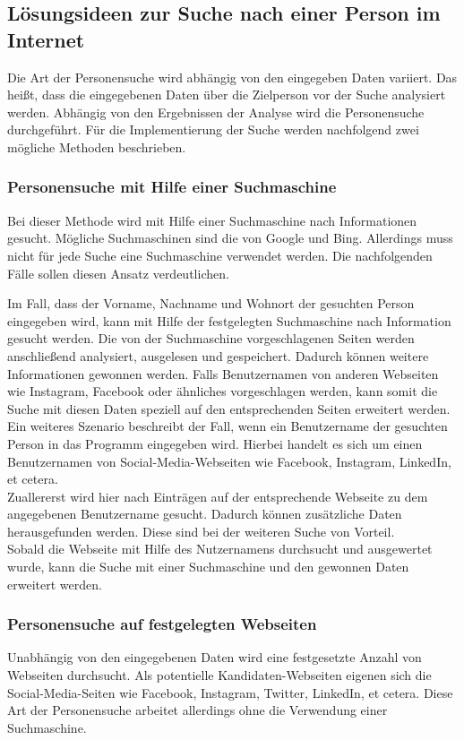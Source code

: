 	\subsection{Lösungsideen zur Suche nach einer Person im Internet}
	\label{sec:Suche nach Information}
	Die Art der Personensuche wird abhängig von den eingegeben Daten variiert. Das heißt, dass die eingegebenen Daten über die Zielperson vor der Suche analysiert werden. Abhängig von den Ergebnissen der Analyse wird die Personensuche durchgeführt. Für die Implementierung der Suche werden nachfolgend zwei mögliche Methoden beschrieben.
	
		\subsubsection{Personensuche mit Hilfe einer Suchmaschine}
		\label{subsubsec:PersonensucheMitHilfevonSuchmaschine}
		Bei dieser Methode wird mit Hilfe einer Suchmaschine nach Informationen gesucht. Mögliche Suchmaschinen sind die von Google und Bing. Allerdings muss nicht für jede Suche eine Suchmaschine verwendet werden. Die nachfolgenden Fälle sollen diesen Ansatz verdeutlichen.
		
		Im Fall, dass der Vorname, Nachname und Wohnort der gesuchten Person eingegeben wird, kann mit Hilfe der festgelegten Suchmaschine nach Information gesucht werden. Die von der Suchmaschine vorgeschlagenen Seiten werden anschließend analysiert, ausgelesen und gespeichert. Dadurch können weitere Informationen gewonnen werden. Falls Benutzernamen von anderen Webseiten wie Instagram, Facebook oder ähnliches vorgeschlagen werden, kann somit die Suche mit diesen Daten speziell auf den entsprechenden Seiten erweitert werden.\\
		Ein weiteres Szenario beschreibt der Fall, wenn ein Benutzername der gesuchten Person in das Programm eingegeben wird. Hierbei handelt es sich um einen Benutzernamen von Social-Media-Webseiten wie Facebook, Instagram, LinkedIn, et cetera. \\
		Zuallererst wird hier nach Einträgen auf der entsprechende Webseite zu dem angegebenen Benutzername gesucht. Dadurch können zusätzliche Daten herausgefunden werden. Diese sind bei der weiteren Suche von Vorteil.\\
		Sobald die Webseite mit Hilfe des Nutzernamens durchsucht und ausgewertet wurde, kann die Suche mit einer Suchmaschine und den gewonnen Daten erweitert werden.
		
		\subsubsection{Personensuche auf festgelegten Webseiten}
		\label{subsubsec:PersonensucheohneSuchmaschine}
		Unabhängig von den eingegebenen Daten wird eine festgesetzte Anzahl von Webseiten durchsucht. Als potentielle Kandidaten-Webseiten eigenen sich die Social-Media-Seiten wie Facebook, Instagram, Twitter, LinkedIn, et cetera. Diese Art der Personensuche arbeitet allerdings ohne die Verwendung einer Suchmaschine.
		
